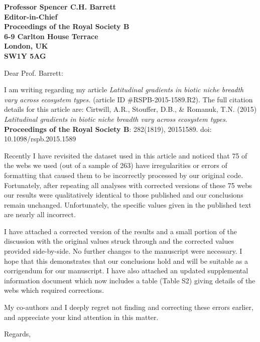 \documentclass[12pt]{letter}
\begin{document}
\begin{letter}{\bf Professor Spencer C.H. Barrett\\
               Editor-in-Chief\\
               Proceedings of the Royal Society B\\
               6-9 Carlton House Terrace\\
               London, UK\\
               SW1Y 5AG\\
                }

\opening{Dear Prof. Barrett:}

I am writing regarding my article \emph{Latitudinal gradients in biotic niche breadth vary across ecosystem types.} (article ID \#RSPB-2015-1589.R2). The full citation details for this article are: Cirtwill, A.R., Stouffer, D.B., \& Romanuk, T.N. (2015) \emph{Latitudinal gradients in biotic niche breadth vary across ecosystem types}. \textbf{Proceedings of the Royal Society B}: 282(1819), 20151589. doi: 10.1098/rspb.2015.1589 


Recently I have revisited the dataset used in this article and noticed that 75  of the webs we used (out of a sample of 263) have irregularities or errors of formatting that caused them to be incorrectly processed by our original code. Fortunately, after repeating all analyses with corrected versions of these 75 webs our results were qualitatively identical to those published and our conclusions remain unchanged. Unfortunately, the specific values given in the published text are nearly all incorrect. 


I have attached a corrected version of the results and a small portion of the discussion with the original values struck through and the corrected values provided side-by-side. No further changes to the manuscript were necessary. I hope that this demonstrates that our conclusions hold and will be suitable as a corrigendum for our manuscript. I have also attached an updated supplemental information document which now includes a table (Table S2) giving details of the webs which required corrections.


My co-authors and I deeply regret not finding and correcting these errors earlier, and appreciate your kind attention in this matter.


\closing{Regards,}


\end{letter}


\end{document}
